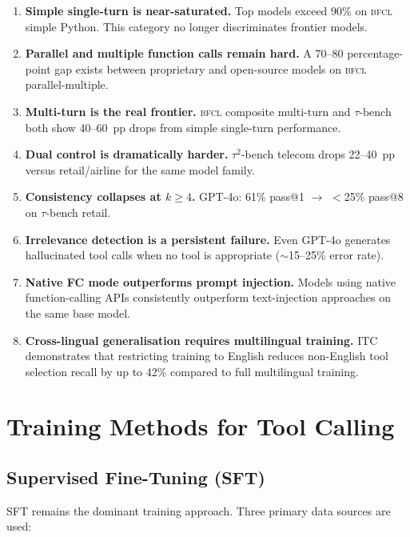 \documentclass[11pt]{article}
\newcommand{\taubench}{$\tau$-bench}
\newcommand{\tautwobench}{$\tau^2$-bench}
\newcommand{\bfcl}{\textsc{bfcl}}
\begin{document}
\begin{enumerate}[leftmargin=1.4em, itemsep=3pt]
  \item \textbf{Simple single-turn is near-saturated.} Top models exceed 90\% on \bfcl{} simple
        Python. This category no longer discriminates frontier models.
  \item \textbf{Parallel and multiple function calls remain hard.} A 70--80 percentage-point gap
        exists between proprietary and open-source models on \bfcl{} parallel-multiple.
  \item \textbf{Multi-turn is the real frontier.} \bfcl{} composite multi-turn and \taubench{}
        both show 40--60~pp drops from simple single-turn performance.
  \item \textbf{Dual control is dramatically harder.} \tautwobench{} telecom drops 22--40~pp
        versus retail/airline for the same model family.
  \item \textbf{Consistency collapses at $k \geq 4$.} GPT-4o: 61\% pass@1 $\rightarrow$
        $<$25\% pass@8 on \taubench{} retail.
  \item \textbf{Irrelevance detection is a persistent failure.} Even GPT-4o generates hallucinated
        tool calls when no tool is appropriate ($\sim$15--25\% error rate).
  \item \textbf{Native FC mode outperforms prompt injection.} Models using native function-calling
        APIs consistently outperform text-injection approaches on the same base model.
  \item \textbf{Cross-lingual generalisation requires multilingual training.} ITC~\citep{itc2025}
        demonstrates that restricting training to English reduces non-English tool selection recall
        by up to 42\% compared to full multilingual training.
\end{enumerate}

\section{Training Methods for Tool Calling}
\label{sec:training}

\subsection{Supervised Fine-Tuning (SFT)}

SFT remains the dominant training approach. Three primary data sources are used:
\end{document}
